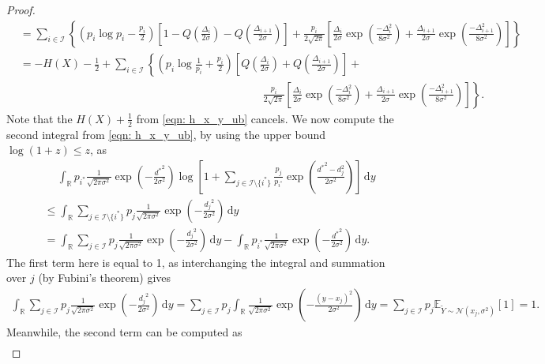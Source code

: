 \documentclass[11pt]{article}
\newcommand{\calI}{\mathcal{I}}
\newcommand{\calN}{\mathcal{N}}
\newcommand{\bbE}{\mathbb{E}}
\newcommand{\bbR}{\mathbb{R}}
\newcommand{\intR}{\int_{\bbR}}
\renewcommand{\d}{\,\mathrm{d}}
\begin{document}
\begin{proof}[Proof]
\begin{align*}
			&= \sum_{i \in \calI} \left\{ \left(p_i\log p_i-\tfrac{p_i}{2}\right) \left[1-Q\left(\tfrac{\Delta_i}{2\sigma}\right)-Q\left(\tfrac{\Delta_{i+1}}{2\sigma}\right)\right] + \tfrac{p_i}{2\sqrt{2\pi}}\left[\tfrac{\Delta_i}{2\sigma}\exp\left(\tfrac{-\Delta_i^2}{8\sigma^2}\right)+\tfrac{\Delta_{i+1}}{2\sigma}\exp\left(\tfrac{-\Delta_{i+1}^2}{8\sigma^2}\right)\right] \right\} \\
			&= -H(X)-\tfrac12 + \sum_{i \in \calI} \left\{ \left(p_i\log \tfrac{1}{p_i}+\tfrac{p_i}{2}\right) \left[Q\left(\tfrac{\Delta_i}{2\sigma}\right)+Q\left(\tfrac{\Delta_{i+1}}{2\sigma}\right)\right] + \right.\\
			&\qquad \qquad \qquad \qquad \qquad \qquad  \qquad \qquad \qquad \qquad \qquad \left.\tfrac{p_i}{2\sqrt{2\pi}}\left[\tfrac{\Delta_i}{2\sigma}\exp\left(\tfrac{-\Delta_i^2}{8\sigma^2}\right)+\tfrac{\Delta_{i+1}}{2\sigma}\exp\left(\tfrac{-\Delta_{i+1}^2}{8\sigma^2}\right)\right] \right\}.
		\end{align*}
		Note that the $H(X) + \frac12$ from \eqref{eqn: h_x_y_ub} cancels. We now compute the second integral from \eqref{eqn: h_x_y_ub}, by using the upper bound $\log(1+z) \leq z$, as
		\begin{align*}
			& \quad \ \intR p_{i^*} \tfrac{1}{\sqrt{2\pi \sigma^2}}\exp\left(-\tfrac{{d^*}^2}{2\sigma^2}\right) \log \left[1 + \sum_{j \in \calI \setminus \{i^*\}} \frac{p_j}{p_{i^*}} \exp\left(\tfrac{{d^*}^2-d_j^2}{2\sigma^2}\right)\right] \d y\\
			&\leq \intR \sum_{j \in \calI \setminus \{i^*\}} p_j \tfrac{1}{\sqrt{2\pi \sigma^2}}\exp\left(-\tfrac{{d_j}^2}{2\sigma^2}\right) \d y\\
			&= \intR \sum_{j \in \calI} p_j \tfrac{1}{\sqrt{2\pi \sigma^2}}\exp\left(-\tfrac{{d_j}^2}{2\sigma^2}\right) \d y - \intR p_{i^*} \tfrac{1}{\sqrt{2\pi \sigma^2}}\exp\left(-\tfrac{{d^*}^2}{2\sigma^2}\right) \d y.
		\end{align*}
		The first term here is equal to 1, as interchanging the integral and summation over $j$ (by Fubini's theorem) gives 
		\begin{align*}
			\intR \sum_{j \in \calI} p_j \tfrac{1}{\sqrt{2\pi \sigma^2}}\exp\left(-\tfrac{{d_j}^2}{2\sigma^2}\right) \d y = \sum_{j \in \calI} p_j \intR \tfrac{1}{\sqrt{2\pi \sigma^2}}\exp\left(-\tfrac{{(y-x_j)}^2}{2\sigma^2}\right) \d y = \sum_{j \in \calI} p_j \bbE_{\tilde Y \sim \calN(x_j, \sigma^2)}[1] = 1.
		\end{align*}
		Meanwhile, the second term can be computed as
		\begin{align*}

\end{align*}
\end{proof}
\end{document}
